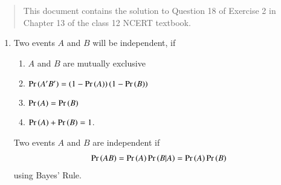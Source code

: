 \documentclass[journal,12pt,twocolumn]{IEEEtran}
\begin{document}
\begin{abstract}
    This document contains the solution to Question 18 of 
    Exercise 2 in Chapter 13 of the class 12 NCERT textbook.
\end{abstract}

\begin{enumerate}
    \item Two events $A$ and $B$ will be independent, if
    \begin{enumerate}
        \item $A$ and $B$ are mutually exclusive
        \item $\Pr\left(A'B'\right) = \left(1 - \Pr\left(A\right)\right)\left(1 - \Pr\left(B\right)\right)$
        \item $\Pr\left(A\right) = \Pr\left(B\right)$
        \item $\Pr\left(A\right) + \Pr\left(B\right) = 1$.
    \end{enumerate}

    \solution Two events $A$ and $B$ are independent if
    \begin{align}
        \Pr\left(AB\right) = \Pr\left(A\right)\Pr\left(B|A\right) = \Pr\left(A\right)\Pr\left(B\right) \label{eq:indep}
    \end{align}
    using Bayes' Rule.
    

\end{enumerate}
\end{document}
